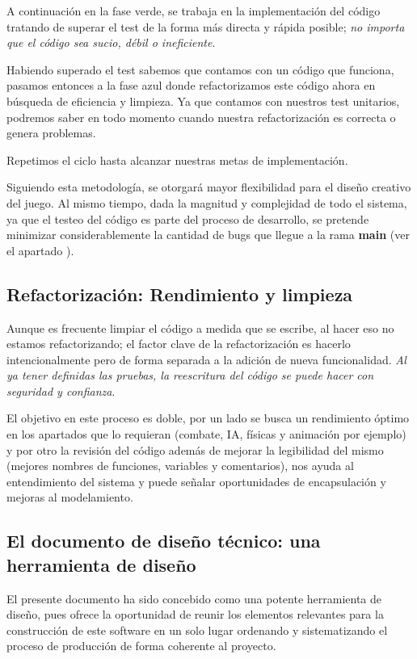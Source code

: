 A continuación en la fase verde, se trabaja en la implementación del código tratando de superar el test de la forma más directa y rápida posible; \textit{no importa que el código sea sucio, débil o ineficiente}.

Habiendo superado el test sabemos que contamos con un código que funciona, pasamos entonces a la fase azul donde refactorizamos este código ahora en búsqueda de eficiencia y limpieza. Ya que contamos con nuestros test unitarios, podremos saber en todo momento cuando nuestra refactorización es correcta o genera problemas.

Repetimos el ciclo hasta alcanzar nuestras metas de implementación.

Siguiendo esta metodología, se otorgará mayor flexibilidad para el diseño creativo del juego. Al mismo tiempo, dada la magnitud y complejidad de todo el sistema, ya que el testeo del código es parte del proceso de desarrollo, se pretende minimizar considerablemente la cantidad de bugs que llegue a la rama \textbf{main} (ver el apartado ).

\subsection{Refactorización: Rendimiento y limpieza}\label{principios:refactorizacion-rendimiento-limpieza}
Aunque es frecuente limpiar el código a medida que se escribe, al hacer eso no estamos refactorizando; el factor clave de la refactorización es hacerlo intencionalmente pero de forma separada a la adición de nueva funcionalidad. \emph{Al ya tener definidas las pruebas, la reescritura del código se puede hacer con seguridad y confianza}.

El objetivo en este proceso es doble, por un lado se busca un rendimiento óptimo en los apartados que lo requieran (combate, IA, físicas y animación por ejemplo) y por otro la revisión del código además de mejorar la legibilidad del mismo (mejores nombres de funciones, variables y comentarios), nos ayuda al entendimiento del sistema y puede señalar oportunidades de encapsulación y mejoras al modelamiento.

\subsection{El documento de diseño técnico: una herramienta de diseño}\label{principios:documento-tecnico-como-herramienta}
El presente documento ha sido concebido como una potente herramienta de diseño, pues ofrece la oportunidad de reunir los elementos relevantes para la construcción de este software en un solo lugar ordenando y sistematizando el proceso de producción de forma coherente al proyecto.

